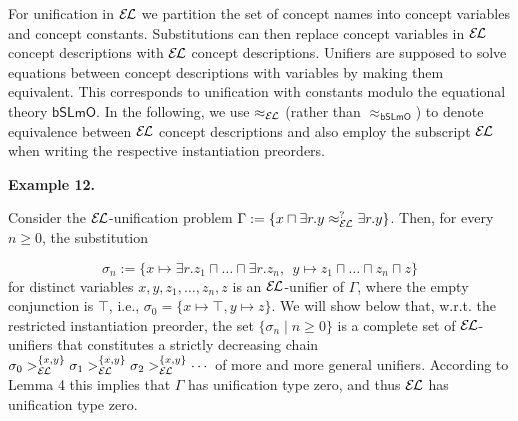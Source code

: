 \documentclass[10pt,a4paper]{amsart}
\begin{document}
 
For unification in $\mathcal{E\mkern-1.618muL}$ we partition the set of concept names into concept variables and concept constants. Substitutions can then replace concept variables in $\mathcal{E\mkern-1.618muL}$ concept descriptions with $\mathcal{E\mkern-1.618muL}$ concept descriptions. Unifiers are supposed to solve equations between concept descriptions with variables by making them equivalent. This corresponds to unification with constants modulo the equational theory $\mathsf{bSLmO}$. In the following, we use $\approx_{\mathcal{E\mkern-1.618muL}}$ (rather than $\approx_{\mathsf{bSLmO}}$) to denote equivalence between $\mathcal{E\mkern-1.618muL}$ concept descriptions and also employ the subscript $\mathcal{E\mkern-1.618muL}$ when writing the respective instantiation preorders.\par
 
 
 
\par\medskip\noindent\textbf{Example 12.}\par
 
 
Consider the $\mathcal{E\mkern-1.618muL}$-unification problem $\Gamma:=\{x\sqcap\exists r.y\approx_{\mathcal{E\mkern-1.618muL}}^{?}\exists r.y\}$. Then, for every $n\geq 0$, the substitution\par
    \[\sigma_{n}:=\{x\mapsto\exists r.z_{1}\sqcap\ldots\sqcap\exists r.z_{n},\ \ y%
\mapsto z_{1}\sqcap\ldots\sqcap z_{n}\sqcap z\}\]    
for distinct variables $x,y,z_{1},\ldots,z_{n},z$ is an $\mathcal{E\mkern-1.618muL}$-unifier of $\Gamma$, where the empty conjunction is $\top$, i.e., $\sigma_{0}=\{x\mapsto\top,y\mapsto z\}$. We will show below that, w.r.t. the restricted instantiation preorder, the set $\{\sigma_{n}\mid n\geq 0\}$ is a complete set of $\mathcal{E\mkern-1.618muL}$-unifiers that constitutes a strictly decreasing chain $\sigma_{0}>_{\mathcal{E\mkern-1.618muL}}^{\{x,y\}}\sigma_{1}>_{\mathcal{E%
\mkern-1.618muL}}^{\{x,y\}}\sigma_{2}>_{\mathcal{E\mkern-1.618muL}}^{\{x,y\}}\cdots$ of more and more general unifiers. According to Lemma 4 this implies that $\Gamma$ has unification type zero, and thus $\mathcal{E\mkern-1.618muL}$ has unification type zero.\par
 
 
 
\end{document}

